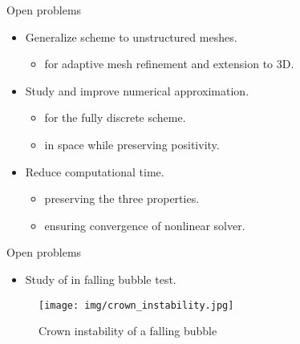 \begin{frame}{Open problems}
  \begin{itemize}\setlength{\itemsep}{1em}
      \item<1-> Generalize scheme to unstructured meshes.
      \begin{itemize}\setlength{\itemsep}{0.5em}
        \item<2->  for adaptive mesh refinement and extension to 3D.
      \end{itemize}
      \item<3-> Study and improve numerical approximation.
      \begin{itemize}\setlength{\itemsep}{0.5em}
        \item<4->  for the fully discrete scheme.
        \item<5->  in space while preserving positivity.
      \end{itemize}
      \item<6-> Reduce computational time.
      \begin{itemize}\setlength{\itemsep}{0.5em}
        \item<7->  preserving the three properties.
        \item<8->  ensuring convergence of nonlinear solver.
      \end{itemize}
  \end{itemize}
\end{frame}

\begin{frame}{Open problems}
  \addtocounter{framenumber}{-1}
  \begin{itemize}
    \item Study of  in falling bubble test.
  \end{itemize}

  \begin{figure}
    \texttt{[image: img/crown\_instability.jpg]}
    \caption{Crown instability of a falling bubble }
  \end{figure}
\end{frame}

